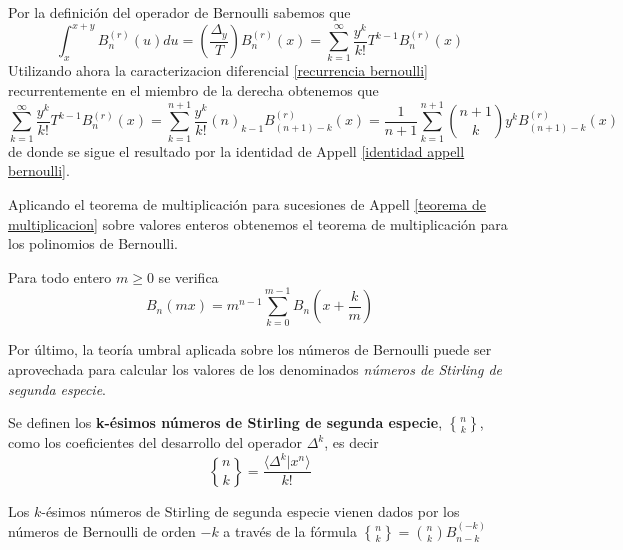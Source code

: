 \begin{demo}
    Por la definición del operador de Bernoulli sabemos que
    \begin{equation*}
        \int_{x}^{x + y} B_n^{(r)}(u) du = \left(\frac{\Delta_y}{T}\right) B_n^{(r)}(x) = \sum_{k=1}^{\infty} \frac{y^k}{k!} T^{k-1}B_{n}^{(r)}(x) 
    \end{equation*}
    Utilizando ahora la caracterizacion diferencial \ref{recurrencia bernoulli} recurrentemente en el miembro de la derecha obtenemos que
    \begin{equation*}
        \sum_{k=1}^{\infty} \frac{y^k}{k!} T^{k-1}B_{n}^{(r)}(x) = \sum_{k=1}^{n+1} \frac{y^k}{k!} (n)_{k-1}B_{(n+1) - k}^{(r)}(x) = \frac{1}{n+1} \sum_{k=1}^{n+1} \binom{n+1}{k} y^k B_{(n+1) - k}^{(r)}(x)
    \end{equation*}
    de donde se sigue el resultado por la identidad de Appell \ref{identidad appell bernoulli}.
\end{demo}

Aplicando el teorema de multiplicación para sucesiones de Appell \ref{teorema de multiplicacion} sobre valores enteros obtenemos el teorema de multiplicación para los polinomios de Bernoulli.

\begin{teorema}
    Para todo entero $m \geq 0$ se verifica
    \begin{equation*}
        B_n(mx) = m^{n-1} \sum_{k=0}^{m-1} B_n \left(x + \frac{k}{m} \right)
    \end{equation*}
\end{teorema}

Por último, la teoría umbral aplicada sobre los números de Bernoulli puede ser aprovechada para calcular los valores de los denominados \textit{números de Stirling de segunda especie}.

\begin{definicion}
    Se definen los \textbf{k-ésimos números de Stirling de segunda especie}, ${n \brace k}$, como los coeficientes del desarrollo del operador $\Delta^k$, es decir
    \begin{equation*}
        {n \brace k} = \frac{\langle \Delta^k | x^n \rangle}{k!}
    \end{equation*}
\end{definicion}

\begin{proposicion}
    Los $k$-ésimos números de Stirling de segunda especie vienen dados por los números de Bernoulli de orden $-k$ a través de la fórmula $\displaystyle {n \brace k} = \binom{n}{k}B_{n-k}^{(-k)}$
\end{proposicion}

